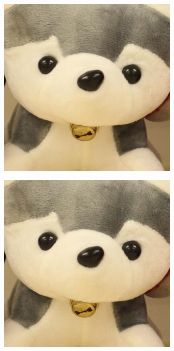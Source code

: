 \begin{figure}
\begin{subfigure}[t]{0.24\textwidth}
    \end{subfigure}
    \hfill
    \begin{subfigure}[t]{0.24\textwidth}
        \centering
        \includegraphics[width=1\textwidth]{images/dataset/Canon5D2_5_200_3200_toy_3_mean.JPG}
    \end{subfigure}
\hfill
    \begin{subfigure}[t]{0.24\textwidth}
        \centering
        \includegraphics[width=1\textwidth]{images/dataset/Canon5D2_5_200_3200_toy_3_real.JPG}
    \end{subfigure}


\end{figure}
